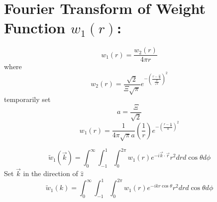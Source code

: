 \documentclass[double,12pt]{beavtex}
\begin{document}
\[{}\]
\section{Fourier Transform of Weight Function $w_{1}(r)$:}
\begin{equation}{w_1(r)=\frac{w_2(r)}{4{\pi}r}}\end{equation}
where
\begin{equation}{w_2(r)=\frac{\sqrt{2}}{\Xi\sqrt{\pi}}e^{-\left(\frac{r-\frac{\alpha}{2}}{\frac{\Xi}{\sqrt{2}}}\right)^2}}\end{equation}
temporarily set 
\begin{equation}{a=\frac{\Xi}{\sqrt{2}}}\end{equation}
\begin{equation}{w_1(r)=\frac{1}{4{\pi}\sqrt{\pi}a}\left(\frac{1}{r}\right)e^{-\left(\frac{r-\frac{\alpha}{2}}{a}\right)^2}}\end{equation}

\begin{equation}{\widetilde{w}_1(\vec{k})=\int_{0}^{\infty}\int_{-1}^{1}\int_{0}^{2\pi}w_1(r)e^{-i\vec{k}\cdot{\vec{r}}}r^2d{r}d{\cos\theta}d{\phi}}\end{equation}
Set $\vec{k}$ in the direction of $\hat{z}$ 
\begin{equation}{\widetilde{w}_1(k)=\int_{0}^{\infty}\int_{-1}^{1}\int_{0}^{2\pi}w_1(r)e^{-ikr\cos\theta}r^2d{r}d{\cos\theta}d{\phi}}\end{equation}
\end{document}
